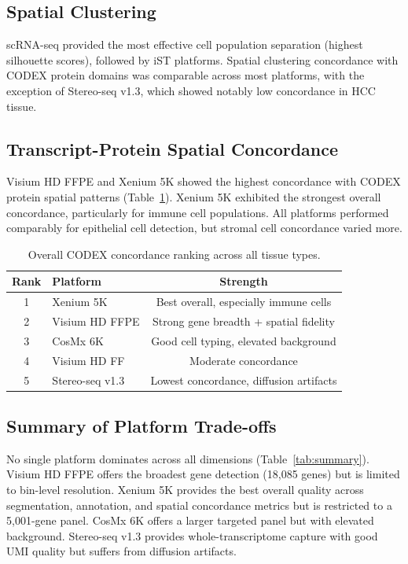 \documentclass[11pt]{article}
\begin{document}
\subsection{Spatial Clustering}
scRNA-seq provided the most effective cell population separation (highest silhouette scores), followed by iST platforms. Spatial clustering concordance with CODEX protein domains was comparable across most platforms, with the exception of Stereo-seq v1.3, which showed notably low concordance in HCC tissue.

\subsection{Transcript-Protein Spatial Concordance}
Visium HD FFPE and Xenium 5K showed the highest concordance with CODEX protein spatial patterns (Table~\ref{tab:codex}). Xenium 5K exhibited the strongest overall concordance, particularly for immune cell populations. All platforms performed comparably for epithelial cell detection, but stromal cell concordance varied more.

\begin{table}[h]
\centering
\caption{Overall CODEX concordance ranking across all tissue types.}
\label{tab:codex}
\begin{tabular}{clc}
\toprule
Rank & Platform & Strength \\
\midrule
1 & Xenium 5K & Best overall, especially immune cells \\
2 & Visium HD FFPE & Strong gene breadth + spatial fidelity \\
3 & CosMx 6K & Good cell typing, elevated background \\
4 & Visium HD FF & Moderate concordance \\
5 & Stereo-seq v1.3 & Lowest concordance, diffusion artifacts \\
\bottomrule
\end{tabular}
\end{table}

\subsection{Summary of Platform Trade-offs}
No single platform dominates across all dimensions (Table~\ref{tab:summary}). Visium HD FFPE offers the broadest gene detection (18,085 genes) but is limited to bin-level resolution. Xenium 5K provides the best overall quality across segmentation, annotation, and spatial concordance metrics but is restricted to a 5,001-gene panel. CosMx 6K offers a larger targeted panel but with elevated background. Stereo-seq v1.3 provides whole-transcriptome capture with good UMI quality but suffers from diffusion artifacts.
\end{document}
